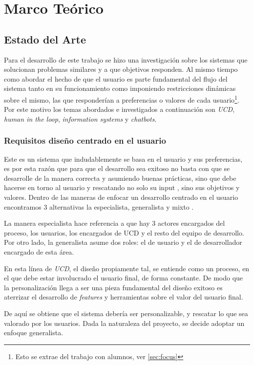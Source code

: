 \chapter{Marco Teórico}\label{mt}
\section{Estado del Arte}
    \par Para el desarrollo de este trabajo se hizo una investigación sobre los sistemas que solucionan problemas similares y a que objetivos responden. Al mismo tiempo como abordar el hecho de que el usuario es parte fundamental del flujo del sistema tanto en su funcionamiento como imponiendo restricciones dinámicas sobre el mismo, las que responderían a preferencias o valores de cada usuario\footnote{Esto se extrae del trabajo con alumnos, ver \ref{sec:focus}}. Por este motivo los temas abordados e investigados a continuación son \textit{\acrfull{UCD}}, \textit{human in the loop}, \textit{information systems} y \textit{chatbots}.
    
    \subsection{Requisitos diseño centrado en el usuario}
    \par Este es un sistema que indudablemente se basa en el usuario y sus preferencias, es por esta razón que para que el desarrollo sea exitoso no basta con que se desarrolle de la manera correcta y asumiendo buenas prácticas, sino que debe hacerse en torno al usuario y rescatando no solo su input \cite{Karat1997}, sino sus objetivos y valores. Dentro de las maneras de enfocar un desarrollo centrado en el usuario encontramos 3 alternativas la especialista, generalista y mixto \cite{Fox2008}.
    \par La manera especialista hace referencia a que hay 3 actores encargados del proceso, los usuarios, los encargados de \acrshort{UCD} y el resto del equipo de desarrollo. Por otro lado, la generalista asume dos roles: el de usuario y el de desarrollador encargado de esta área.
    \par En esta línea de \textit{\acrlong{UCD}}, el diseño propiamente tal, se entiende como un proceso, en el que debe estar involucrado el usuario final, de forma constante.
    De modo que la personalización llega a ser \guillemotleft una pieza fundamental del diseño exitoso es aterrizar el desarrollo de \textit{features} y herramientas sobre el valor del usuario final\guillemotright \cite{Kramer2000}.
    \par De aquí se obtiene que el sistema debería ser personalizable, y rescatar lo que sea valorado por los usuarios. Dada la naturaleza del proyecto, se decide adoptar un enfoque generalista.
    
